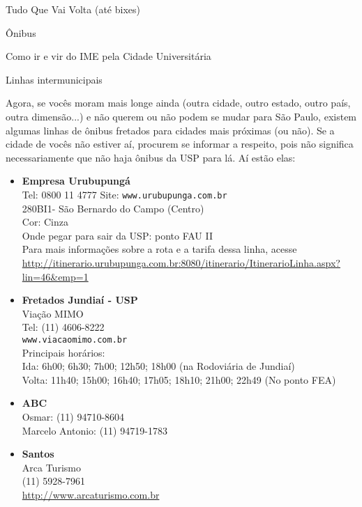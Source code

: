 \begin{secao}{Tudo Que Vai Volta (até bixes)}
\begin{subsecao}{Ônibus}
\begin{subsubsecao}{Como ir e vir do IME pela Cidade Universitária}
\end{subsubsecao}

\begin{subsubsecao}{Linhas intermunicipais}

Agora, se vocês moram mais longe ainda (outra cidade, outro estado, outro país,
outra dimensão...) e não querem ou não podem se mudar para São Paulo, existem
algumas linhas de ônibus fretados para cidades mais próximas (ou não). Se a
cidade de vocês não estiver aí, procurem se informar a respeito, pois não
significa necessariamente que não haja ônibus da USP para lá. Aí estão elas:

\begin{itemize}
  \item {\bf Empresa Urubupungá}\\
    Tel: 0800 11 4777
    Site: {\tt www.urubupunga.com.br}\\
    280BI1- São Bernardo do Campo (Centro)\\
    Cor: Cinza\\
    Onde pegar para sair da USP: ponto FAU II\\
    Para mais informações sobre a rota e a tarifa dessa linha, acesse
    \url{http://itinerario.urubupunga.com.br:8080/itinerario/ItinerarioLinha.aspx?lin=46\&emp=1}

  \item {\bf Fretados Jundiaí - USP}\\
    Viação MIMO\\
    Tel: (11) 4606-8222\\
    {\tt www.viacaomimo.com.br}\\
    Principais horários:\\
    Ida: 6h00; 6h30; 7h00; 12h50; 18h00 (na Rodoviária de Jundiaí)\\
    Volta: 11h40; 15h00; 16h40; 17h05; 18h10; 21h00; 22h49 (No ponto FEA)

  \item {\bf ABC}\\
    Osmar: (11) 94710-8604\\
    Marcelo Antonio: (11) 94719-1783

  \item {\bf Santos}\\
    Arca Turismo\\
    (11) 5928-7961\\
    \url{http://www.arcaturismo.com.br}

\end{itemize}


\end{subsubsecao}
\end{subsecao}
\end{secao}
